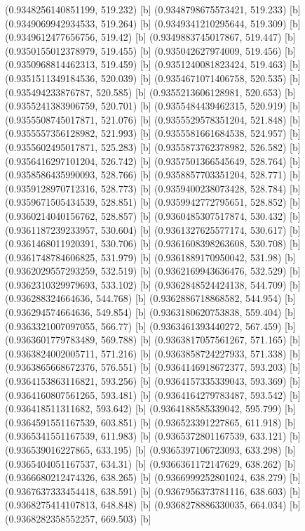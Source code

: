 {{{(0.9348256140851199, 519.232) [b] 
(0.9348798675573421, 519.233) [b] 
(0.9349069942934533, 519.264) [b] 
(0.9349341210295644, 519.309) [b] 
(0.9349612477656756, 519.42) [b] 
(0.9349883745017867, 519.447) [b] 
(0.9350155012378979, 519.455) [b] 
(0.935042627974009, 519.456) [b] 
(0.9350968814462313, 519.459) [b] 
(0.9351240081823424, 519.463) [b] 
(0.9351511349184536, 520.039) [b] 
(0.9354671071406758, 520.535) [b] 
(0.935494233876787, 520.585) [b] 
(0.9355213606128981, 520.653) [b] 
(0.9355241383906759, 520.701) [b] 
(0.9355484439462315, 520.919) [b] 
(0.9355508745017871, 521.076) [b] 
(0.9355529578351204, 521.848) [b] 
(0.9355557356128982, 521.993) [b] 
(0.9355581661684538, 524.957) [b] 
(0.9355602495017871, 525.283) [b] 
(0.9355873762378982, 526.582) [b] 
(0.9356416297101204, 526.742) [b] 
(0.9357501366545649, 528.764) [b] 
(0.9358586435990093, 528.766) [b] 
(0.9358857703351204, 528.771) [b] 
(0.9359128970712316, 528.773) [b] 
(0.9359400238073428, 528.784) [b] 
(0.9359671505434539, 528.851) [b] 
(0.9359942772795651, 528.852) [b] 
(0.9360214040156762, 528.857) [b] 
(0.9360485307517874, 530.432) [b] 
(0.9361187239233957, 530.604) [b] 
(0.9361327625577174, 530.617) [b] 
(0.9361468011920391, 530.706) [b] 
(0.9361608398263608, 530.708) [b] 
(0.9361748784606825, 531.979) [b] 
(0.9361889170950042, 531.98) [b] 
(0.9362029557293259, 532.519) [b] 
(0.9362169943636476, 532.529) [b] 
(0.9362310329979693, 533.102) [b] 
(0.9362848524424138, 544.709) [b] 
(0.936288324664636, 544.768) [b] 
(0.9362886718868582, 544.954) [b] 
(0.936294574664636, 549.854) [b] 
(0.9363180620753838, 559.404) [b] 
(0.9363321007097055, 566.77) [b] 
(0.9363461393440272, 567.459) [b] 
(0.9363601779783489, 569.788) [b] 
(0.9363817057561267, 571.165) [b] 
(0.9363824002005711, 571.216) [b] 
(0.9363858724227933, 571.338) [b] 
(0.9363865668672376, 576.551) [b] 
(0.9364146918672377, 593.203) [b] 
(0.9364153863116821, 593.256) [b] 
(0.9364157335339043, 593.369) [b] 
(0.9364160807561265, 593.481) [b] 
(0.9364164279783487, 593.542) [b] 
(0.936418511311682, 593.642) [b] 
(0.9364188585339042, 595.799) [b] 
(0.9364591551167539, 603.851) [b] 
(0.936523391227865, 611.918) [b] 
(0.9365341551167539, 611.983) [b] 
(0.9365372801167539, 633.121) [b] 
(0.936539016227865, 633.195) [b] 
(0.9365397106723093, 633.298) [b] 
(0.9365404051167537, 634.31) [b] 
(0.9366361172147629, 638.262) [b] 
(0.9366680212474326, 638.265) [b] 
(0.9366999252801024, 638.279) [b] 
(0.9367637333454418, 638.591) [b] 
(0.9367956373781116, 638.603) [b] 
(0.9368275414107813, 648.848) [b] 
(0.9368278886330035, 664.034) [b] 
(0.9368282358552257, 669.503) [b] 
}}}
